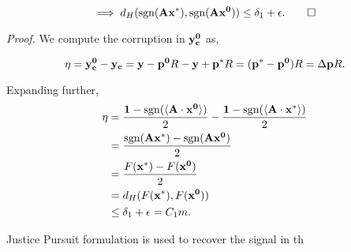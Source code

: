 $$
\implies d_H(\mathrm{sgn}({\mathbf{Ax^*}}), \mathrm{sgn}({\mathbf{Ax^0}})) \leq \delta_1 + \epsilon.
\qed
$$




\textit{Proof.} We compute the corruption in $\mathbf{y_c^0}$ as,

$$
\eta = \mathbf{y_c^0 - y_c} = \mathbf{y} - \mathbf{p^0}R - \mathbf{y} + \mathbf{p^*}R = (\mathbf{p^*-p^0})R = \Delta\mathbf{p}R.
$$

Expanding further,
\begin{align*}
\eta  & = \frac{\mathbf{1}-\mathrm{sgn}(\langle \mathbf{A} \cdot \mathbf{x^0} \rangle)}{2} -  \frac{\mathbf{1}-\mathrm{sgn}(\langle \mathbf{A} \cdot \mathbf{x^*} \rangle)}{2} \\
& = \frac{\mathrm{sgn}({\mathbf{Ax^*}})- \mathrm{sgn}({\mathbf{Ax^0}})}{2} \\
& = \frac{F\mathbf{(x^*)} - F\mathbf{(x^0)}}{2} \\
& = d_H(F\mathbf{(x^*)}, F\mathbf{(x^0)}) \\
& \leq \delta_1 + \epsilon = C_1m.
\end{align*}

Justice Pursuit formulation is used to recover the signal in th